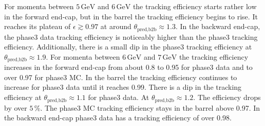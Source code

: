 \documentclass[a4paper,11pt,twosided,final,german,openbib,pdftex,listof=totoc,bibliography=totoc]{scrbook}
\begin{document}
For momenta between $5\,\textrm{GeV}$ and $6\,\textrm{GeV}$ the tracking efficiency starts rather low in the forward end-cap, but in the barrel the tracking efficiency begins to rise. It reaches its plateau of $\epsilon \gtrsim 0.97$ at around $\theta_{\textrm{pred,b2b}} \approx 1.3$. In the backward end-cap, the phase3 data tracking efficiency is noticeably higher than the phase3 tracking efficiency. Additionally, there is a small dip in the phase3 tracking efficiency at $\theta_{\textrm{pred,b2b}} \approx 1.9$. 
For momenta between $6\,\textrm{GeV}$ and $7\,\textrm{GeV}$ the tracking efficiency increases in the forward end-cap from  about 0.8 to 0.95 for phase3 data and to over 0.97 for phase3 MC. In the barrel the tracking efficiency continues to increase for phase3 data until it reaches 0.99. There is a dip in the tracking efficiency at $\theta_{\textrm{pred,b2b}} \approx 1.1$ for phase3 data. At $\theta_{\textrm{pred,b2b}} \approx 1.2$. The efficiency drops by over $5\,\%$. The phase3 MC tracking efficiency stays in the barrel above 0.97. In the backward end-cap phase3 data has a tracking efficiency of over 0.98.
\end{document}

